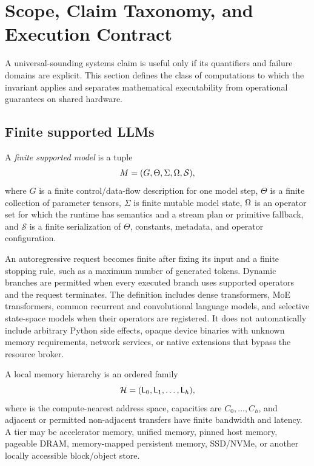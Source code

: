 \section{Scope, Claim Taxonomy, and Execution Contract}
\label{sec:scope}

A universal-sounding systems claim is useful only if its quantifiers and failure domains are explicit. This section defines the class of computations to which the \AMS invariant applies and separates mathematical executability from operational guarantees on shared hardware.

\subsection{Finite supported LLMs}

\begin{definition}
A \emph{finite supported model} is a tuple
\[
  M=(G,\Theta,\Sigma,\Omega,\mathcal S),
\]
where $G$ is a finite control/data-flow description for one model step, $\Theta$ is a finite collection of parameter tensors, $\Sigma$ is finite mutable model state, $\Omega$ is an operator set for which the runtime has semantics and a stream plan or primitive fallback, and $\mathcal S$ is a finite serialization of $\Theta$, constants, metadata, and operator configuration.
\end{definition}

An autoregressive request becomes finite after fixing its input and a finite stopping rule, such as a maximum number of generated tokens. Dynamic branches are permitted when every executed branch uses supported operators and the request terminates. The definition includes dense transformers, MoE transformers, common recurrent and convolutional language models, and selective state-space models when their operators are registered. It does not automatically include arbitrary Python side effects, opaque device binaries with unknown memory requirements, network services, or native extensions that bypass the resource broker.

\begin{definition}
A local memory hierarchy is an ordered family
\[
  \mathcal H=(\mathsf{L}_{0},\mathsf{L}_{1},\ldots,\mathsf{L}_{h}),
\]
where  is the compute-nearest address space, capacities are $C_0,\ldots,C_h$, and adjacent or permitted non-adjacent transfers have finite bandwidth and latency. A tier may be accelerator memory, unified memory, pinned host memory, pageable DRAM, memory-mapped persistent memory, SSD/NVMe, or another locally accessible block/object store.
\end{definition}

